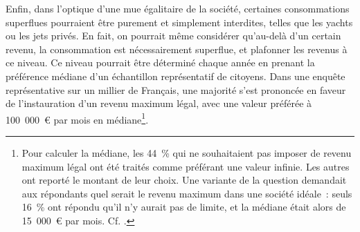 \documentclass[a5paper,french,openany]{memoir}
\begin{document}

Enfin, dans l'optique d'une mue égalitaire de la société, certaines consommations superflues pourraient être purement et simplement interdites, telles que les yachts ou les jets privés. En fait, on pourrait même considérer qu'au-delà d'un certain revenu, la consommation est nécessairement superflue, et plafonner les revenus à ce niveau. Ce niveau pourrait être déterminé chaque année en prenant la préférence médiane d'un échantillon représentatif de citoyens. Dans une enquête représentative sur un millier de Français, une majorité s'est prononcée en faveur de l'instauration d'un revenu maximum légal, avec une valeur préférée à 100~000~\euro{} par mois en médiane\footnote{Pour calculer la médiane, les 44~\% qui ne souhaitaient pas imposer de revenu maximum légal ont été traités comme préférant une valeur infinie. Les autres ont reporté le montant de leur choix. Une variante de la question demandait aux répondants quel serait le revenu maximum dans une société idéale~: seuls 16~\% ont répondu qu'il n'y aurait pas de limite, et la médiane était alors de 15~000~\euro{} par mois. Cf. \cite{fabre_determiner_2022}.}. 
\end{document}
